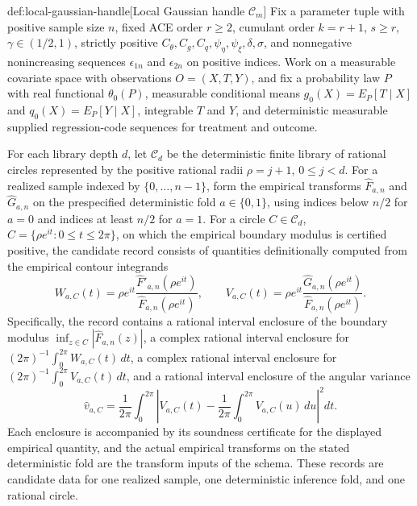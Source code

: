 \documentclass[11pt]{article}
\begin{document}
\begin{definitionv}{def:local-gaussian-handle}[Local Gaussian handle \(\mathscr C_m\)]
Fix a parameter tuple with positive sample size \(n\), fixed ACE order \(r\ge2\), cumulant order \(k=r+1\), \(s\ge r\), \(\gamma\in(1/2,1)\), strictly positive \(C_\theta,C_g,C_q,\psi_\eta,\psi_\xi,\delta,\sigma\), and nonnegative nonincreasing sequences \(\epsilon_{1n}\) and \(\epsilon_{2n}\) on positive indices. Work on a measurable covariate space with observations \(O=(X,T,Y)\), and fix a probability law \(P\) with real functional \(\theta_0(P)\), measurable conditional means \(g_0(X)=E_P[T\mid X]\) and \(q_0(X)=E_P[Y\mid X]\), integrable \(T\) and \(Y\), and deterministic measurable supplied regression-code sequences for treatment and outcome.

For each library depth \(d\), let \(\mathscr C_d\) be the deterministic finite library of rational circles represented by the positive rational radii \(\rho=j+1\), \(0\le j<d\). For a realized sample indexed by \(\{0,\ldots,n-1\}\), form the empirical transforms \(\widehat F_{a,n}\) and \(\widehat G_{a,n}\) on the prespecified deterministic fold \(a\in\{0,1\}\), using indices below \(n/2\) for \(a=0\) and indices at least \(n/2\) for \(a=1\). For a circle \(C\in\mathscr C_d\), \(C=\{\rho e^{it}:0\le t\le2\pi\}\), on which the empirical boundary modulus is certified positive, the candidate record consists of quantities definitionally computed from the empirical contour integrands
\[
 W_{a,C}(t)=\rho e^{it}
 \frac{\widehat F'_{a,n}(\rho e^{it})}
      {\widehat F_{a,n}(\rho e^{it})},
 \qquad
 V_{a,C}(t)=\rho e^{it}
 \frac{\widehat G_{a,n}(\rho e^{it})}
      {\widehat F_{a,n}(\rho e^{it})}.
\]
Specifically, the record contains a rational interval enclosure of the boundary modulus \(\inf_{z\in C}|\widehat F_{a,n}(z)|\), a complex rational interval enclosure for \((2\pi)^{-1}\int_0^{2\pi}W_{a,C}(t)\,dt\), a complex rational interval enclosure for \((2\pi)^{-1}\int_0^{2\pi}V_{a,C}(t)\,dt\), and a rational interval enclosure of the angular variance
\[
 \widehat v_{a,C}
 =\frac1{2\pi}\int_0^{2\pi}
 \left|V_{a,C}(t)-
 \frac1{2\pi}\int_0^{2\pi}V_{a,C}(u)\,du\right|^2dt.
\]
Each enclosure is accompanied by its soundness certificate for the displayed empirical quantity, and the actual empirical transforms on the stated deterministic fold are the transform inputs of the schema. These records are candidate data for one realized sample, one deterministic inference fold, and one rational circle.
\end{definitionv}
\end{document}
